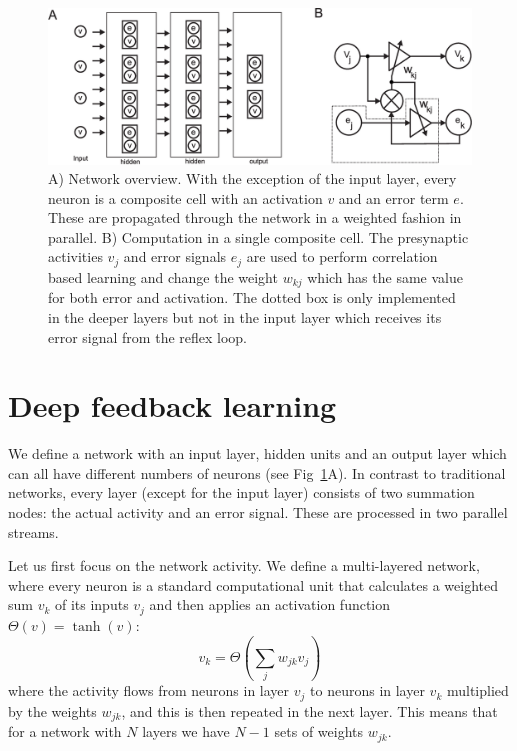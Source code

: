 \documentclass{aamas2018}
\begin{document}
\begin{figure}[!ht]
  \centering
  \includegraphics[width=\columnwidth]{netw_together}
  \caption{A) Network overview. With the exception of the input layer, every
    neuron is a composite cell with an activation $v$ and an error
    term $e$. These are propagated through the network in a weighted
    fashion in parallel.  B) Computation in a single composite cell.
    The presynaptic activities $v_j$ and error signals $e_j$ are used
    to perform correlation based learning and change the weight
    $w_{kj}$ which has the same value for both error and activation.
    The dotted box is only implemented in the deeper layers but not
    in the input layer which receives its error signal from the reflex loop.
    \label{netw_together}}
\end{figure}


\section{Deep feedback learning}
We define a network with an input layer, hidden units and an output
layer which can all have different numbers of neurons (see
Fig~\ref{netw_together}A). In contrast to traditional
networks, every layer (except for the input layer) consists of two
summation nodes: the actual activity and an error signal. These
are processed in two parallel streams.

Let us first focus on the network activity. We define a multi-layered
network, where every neuron is a standard computational unit that
calculates a weighted sum $v_k$ of its inputs $v_j$ and then applies
an activation function $\Theta(v) = \tanh(v)$:
\begin{equation}
  v_k = \Theta\left( \sum_j w_{jk} v_{j} \right) \label{act_sum}
\end{equation}
where the activity flows from neurons in layer $v_j$ to neurons in
layer $v_k$ multiplied by the weights $w_{jk}$, and this
is then repeated in the next layer. This means that for a network with
$N$ layers we have $N-1$ sets of weights $w_{jk}$.
\end{document}
